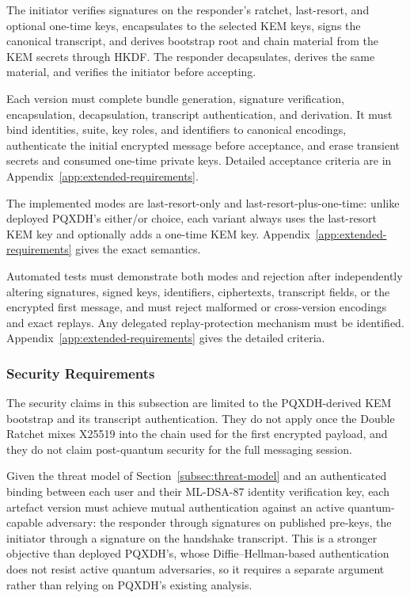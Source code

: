 The initiator verifies signatures on the responder's ratchet, last-resort, and optional one-time keys, encapsulates to the selected KEM keys, signs the canonical transcript, and derives bootstrap root and chain material from the KEM secrets through HKDF. The responder decapsulates, derives the same material, and verifies the initiator before accepting.

Each version must complete bundle generation, signature verification, encapsulation, decapsulation, transcript authentication, and derivation. It must bind identities, suite, key roles, and identifiers to canonical encodings, authenticate the initial encrypted message before acceptance, and erase transient secrets and consumed one-time private keys. Detailed acceptance criteria are in Appendix~\ref{app:extended-requirements}.

The implemented modes are last-resort-only and last-resort-plus-one-time: unlike deployed PQXDH's either/or choice, each variant always uses the last-resort KEM key and optionally adds a one-time KEM key. Appendix~\ref{app:extended-requirements} gives the exact semantics.

Automated tests must demonstrate both modes and rejection after independently altering signatures, signed keys, identifiers, ciphertexts, transcript fields, or the encrypted first message, and must reject malformed or cross-version encodings and exact replays. Any delegated replay-protection mechanism must be identified. Appendix~\ref{app:extended-requirements} gives the detailed criteria.

\subsubsection{Security Requirements}
\label{subsubsec:req-security}

The security claims in this subsection are limited to the PQXDH-derived KEM bootstrap and its transcript authentication. They do not apply once the Double Ratchet mixes X25519 into the chain used for the first encrypted payload, and they do not claim post-quantum security for the full messaging session.

Given the threat model of Section~\ref{subsec:threat-model} and an authenticated binding between each user and their ML-DSA-87 identity verification key, each artefact version must achieve mutual authentication against an active quantum-capable adversary: the responder through signatures on published pre-keys, the initiator through a signature on the handshake transcript. This is a stronger objective than deployed PQXDH's, whose Diffie--Hellman-based authentication does not resist active quantum adversaries, so it requires a separate argument rather than relying on PQXDH's existing analysis.


